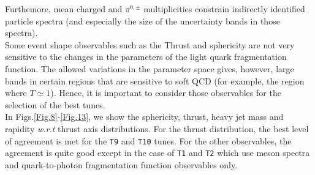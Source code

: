 \documentclass[aps,preprint,floatfix,nofootinbib,showpacs]{revtex4-1}
\begin{document}
Furthemore, mean charged and $\pi^{0,\pm}$ multiplicities 
constrain indirectly identified particle spectra (and especially
the size of the uncertainty bands in those spectra). \\
Some event shape observables such as the Thrust and sphericity
are not very sensitive to the changes in the parameters of 
the light quark fragmentation function. The allowed variations
in the parameter space gives, however, large bands in certain
regions that are sensitive to soft QCD (for example, the region
where $T\simeq 1$). Hence, it is important to consider
those observables for the selection of the best tunes. \\

In Figs.\ref{Fig.8}-\ref{Fig.13}, we show the sphericity, thrust,
heavy jet mass and rapidity \emph{w.r.t} thrust axis distributions.
For the thrust distribution, the best level of agreement is met 
for the \texttt{T9} and \texttt{T10} tunes. For the other observables,
the agreement is quite good except in the case of \texttt{T1} and
\texttt{T2} which use meson spectra and quark-to-photon fragmentation
function observables only.
\end{document}
